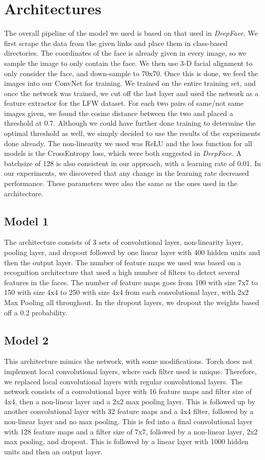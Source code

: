 \documentclass[11pt]{article}
\begin{document}
\section{Architectures} 
\par
The overall pipeline of the model we used is based on that used in \textit{DeepFace}. We first scrape the data from the given links and place them in class-based directories. The coordinates of the face is already given in every image, so we sample the image to only contain the face. We then use 3-D facial alignment to only consider the face, and down-sample to 70x70. Once this is done, we feed the images into our ConvNet for training. We trained on the entire training set, and once the network was trained, we cut off the last layer and used the network as a feature extractor for the LFW dataset. For each two pairs of same/not same images given, we found the cosine distance between the two and placed a threshold at 0.7. Although we could have further done training to determine the optimal threshold as well, we simply decided to use the results of the experiments done already. The non-linearity we used was ReLU and the loss function for all models is the CrossEntropy loss, which were both suggested in \textit{DeepFace}. A batchsize of 128 is also consistent in our approach, with a learning rate of 0.01. In our experiments, we discovered that any change in the learning rate decreased performance. These parameters were also the same as the ones used in the  architecture. 
    \subsection{Model 1}
    The architecture consists of 3 sets of convolutional layer, non-linearity layer, pooling layer, and dropout followed by one linear layer with 400 hidden units and then the output layer. The number of feature maps we used was based on a recognition architecture that used a high number of filters to detect several features in the faces. The number of feature maps goes from 100 with size 7x7 to 150 with size 4x4 to 250 with size 4x4 from each convolutional layer, with 2x2 Max Pooling all throughout. In the dropout layers, we dropout the weights based off a 0.2 probability. 
    \subsection{Model 2}
    This architecture mimics the  network, with some modifications. Torch does not implement local convolutional layers, where each filter used is unique. Therefore, we replaced local convolutional layers with regular convolutional layers. The network consists of a convolutional layer with 16 feature maps and filter size of 4x4, then a non-linear layer and a 2x2 max pooling layer. This is followed up by another convolutional layer with 32 feature maps and a 4x4 filter, followed by a non-linear layer and no max pooling. This is fed into a final convolutional layer with 128 feature maps and a filter size of 7x7, followed by a non-linear layer, 2x2 max pooling, and dropout. This is followed by a linear layer with 1000 hidden units and then an output layer.
\end{document}
